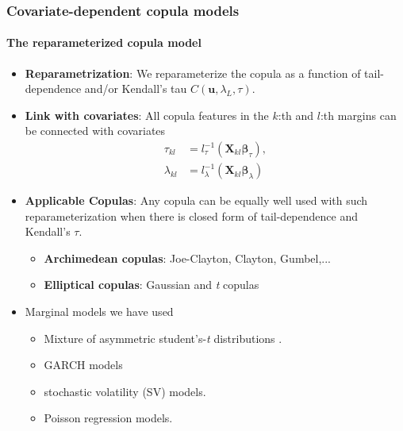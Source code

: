 \documentclass[10pt,aspectratio=169]{beamer}
\begin{document}
\begin{frame}
  \frametitle{Covariate-dependent copula models}
  \framesubtitle{The reparameterized copula model}
  \begin{itemize}


  \item \textbf{Reparametrization}: We reparameterize the copula as a function of
    tail-dependence and/or Kendall's tau $C(\bm{u},\lambda_L,\tau)$.

  \item \textbf{Link with covariates}: All copula features in the $k$:th and $l$:th margins can be connected with
    covariates
      \begin{align*}
        \tau_{kl}&=l_{\tau}^{-1}(\bm{X}_{kl}\bm{\beta}_{\tau}),\\
        \lambda_{kl}&=l_{\lambda}^{-1}(\bm{X}_{kl}\bm{\beta}_{\lambda})
      \end{align*}

    \item \textbf{Applicable Copulas}: Any copula can be equally well used with such
      reparameterization when there is closed form of tail-dependence and Kendall's
      $\tau$.

    \begin{itemize}
    \item \textbf{Archimedean copulas}: Joe-Clayton, Clayton, Gumbel,...
    \item \textbf{Elliptical copulas}: Gaussian and \emph{t} copulas
    \end{itemize}

  \item Marginal models we have used

    \begin{itemize}
    \item Mixture of asymmetric student's-\emph{t} distributions \citep{li2010flexible}.
    \item GARCH models
    \item stochastic volatility (SV) models.
    \item Poisson regression models.
    \end{itemize}

  \end{itemize}
\end{frame}
\end{document}
